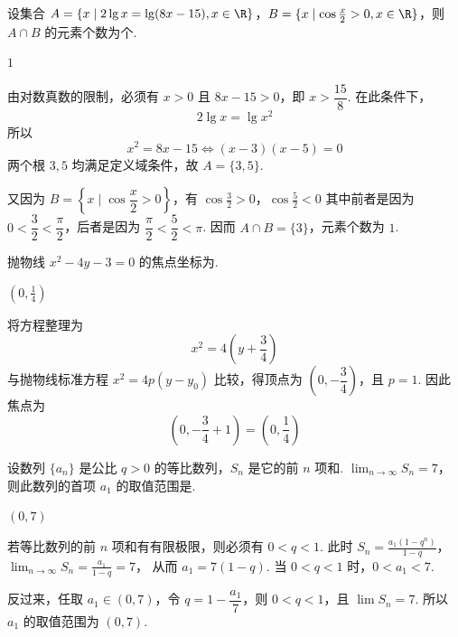 \begin{problem}
设集合 \(A=\{x\mid 2\lg x=\lg(8x-15),x\in\R\}\)，\(B=\{x\mid \cos\frac{x}{2}>0,x\in\R\}\)，则 \(A\cap B\) 的元素个数为\fillinblank{}\(\text{个}\).
\end{problem}

\begin{answer}
\(1\)
\end{answer}

\begin{solution}
由对数真数的限制，必须有 \(x>0\) 且 \(8x-15>0\)，即 \(x>\dfrac{15}{8}\). 在此条件下，
\[
2\lg x=\lg x^2
\]
所以
\[
x^2=8x-15\Longleftrightarrow (x-3)(x-5)=0
\]
两个根 \(3,5\) 均满足定义域条件，故 \(A=\{3,5\}\).

又因为 \(B=\left\{x\mid\cos\dfrac{x}{2}>0\right\}\)，有
\(\cos\frac{3}{2}>0\)，\(\cos\frac{5}{2}<0\)
其中前者是因为 \(0<\dfrac32<\dfrac\pi2\)，后者是因为 \(\dfrac\pi2<\dfrac52<\pi\). 因而 \(A\cap B=\{3\}\)，元素个数为 \(1\).
\end{solution}

\begin{problem}
抛物线 \(x^2-4y-3=0\) 的焦点坐标为\fillinblank{}.
\end{problem}

\begin{answer}
\(\left(0,\frac{1}{4}\right)\)
\end{answer}

\begin{solution}
将方程整理为
\[
x^2=4\left(y+\frac{3}{4}\right)
\]
与抛物线标准方程 \(x^2=4p(y-y_0)\) 比较，得顶点为 \(\left(0,-\dfrac34\right)\)，且 \(p=1\). 因此焦点为
\[
\left(0,-\frac34+1\right)=\left(0,\frac14\right)
\]
\end{solution}

\begin{problem}
设数列 \(\{a_n\}\) 是公比 \(q>0\) 的等比数列，\(S_n\) 是它的前 \(n\) 项和. \(\displaystyle\lim_{n\to\infty}S_n=7\)，则此数列的首项 \(a_1\) 的取值范围是\fillinblank{}.
\end{problem}

\begin{answer}
\((0,7)\)
\end{answer}

\begin{solution}
若等比数列的前 \(n\) 项和有有限极限，则必须有 \(0<q<1\). 此时
\(S_n=\frac{a_1(1-q^n)}{1-q}\)，\(\lim_{n\to\infty}S_n=\frac{a_1}{1-q}=7\)，
从而 \(a_1=7(1-q)\). 当 \(0<q<1\) 时，\(0<a_1<7\).

反过来，任取 \(a_1\in(0,7)\)，令 \(q=1-\dfrac{a_1}{7}\)，则 \(0<q<1\)，且 \(\lim S_n=7\). 所以 \(a_1\) 的取值范围为 \((0,7)\).
\end{solution}


